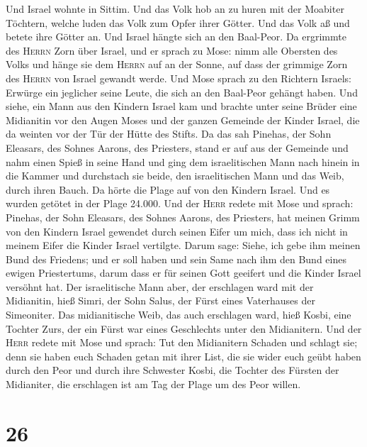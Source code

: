  Und Israel wohnte in Sittim. Und das Volk hob an zu huren
mit der Moabiter Töchtern,  welche luden das Volk zum
Opfer ihrer Götter. Und das Volk aß und betete ihre Götter an.
 Und Israel hängte sich an den Baal-Peor. Da ergrimmte des
\textsc{Herrn} Zorn über Israel,  und er sprach zu Mose:
nimm alle Obersten des Volks und hänge sie dem \textsc{Herrn} auf an der
Sonne, auf dass der grimmige Zorn des \textsc{Herrn} von Israel gewandt
werde.  Und Mose sprach zu den Richtern Israels: Erwürge
ein jeglicher seine Leute, die sich an den Baal-Peor gehängt haben.
 Und siehe, ein Mann aus den Kindern Israel kam und
brachte unter seine Brüder eine Midianitin vor den Augen Moses und der
ganzen Gemeinde der Kinder Israel, die da weinten vor der Tür der Hütte
des Stifts.  Da das sah Pinehas, der Sohn Eleasars, des
Sohnes Aarons, des Priesters, stand er auf aus der Gemeinde und nahm
einen Spieß in seine Hand  und ging dem israelitischen
Mann nach hinein in die Kammer und durchstach sie beide, den
israelitischen Mann und das Weib, durch ihren Bauch. Da hörte die Plage
auf von den Kindern Israel.  Und es wurden getötet in der
Plage 24.000.  Und der \textsc{Herr} redete mit Mose und
sprach:  Pinehas, der Sohn Eleasars, des Sohnes Aarons,
des Priesters, hat meinen Grimm von den Kindern Israel gewendet durch
seinen Eifer um mich, dass ich nicht in meinem Eifer die Kinder Israel
vertilgte.  Darum sage: Siehe, ich gebe ihm meinen Bund
des Friedens;  und er soll haben und sein Same nach ihm
den Bund eines ewigen Priestertums, darum dass er für seinen Gott
geeifert und die Kinder Israel versöhnt hat.  Der
israelitische Mann aber, der erschlagen ward mit der Midianitin, hieß
Simri, der Sohn Salus, der Fürst eines Vaterhauses der Simeoniter.
 Das midianitische Weib, das auch erschlagen ward, hieß
Kosbi, eine Tochter Zurs, der ein Fürst war eines Geschlechts unter den
Midianitern.  Und der \textsc{Herr} redete mit Mose und
sprach:  Tut den Midianitern Schaden und schlagt sie;
 denn sie haben euch Schaden getan mit ihrer List, die
sie wider euch geübt haben durch den Peor und durch ihre Schwester
Kosbi, die Tochter des Fürsten der Midianiter, die erschlagen ist am Tag
der Plage um des Peor willen.

\hypertarget{section-25}{%
\section{26}\label{section-25}}

